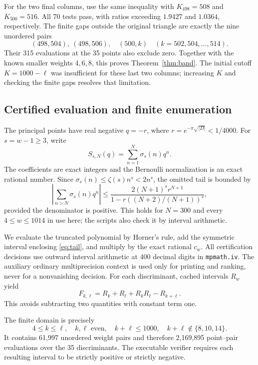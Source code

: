 \documentclass[11pt]{article}
\begin{document}
For the two final columns, use the same inequality with $K_{498}=508$ and $K_{500}=516$. All 70 tests pass, with ratios exceeding $1.9427$ and $1.0364$, respectively. The finite gaps outside the original triangle are exactly the nine unordered pairs
\[
 (498,504),\ (498,506),\quad (500,k)\quad(k=502,504,\ldots,514).
\]
Their 315 evaluations at the 35 points also exclude zero. Together with the known smaller weights $4,6,8$, this proves Theorem~\ref{thm:band}. The initial cutoff $K=1000-\ell$ was insufficient for these last two columns; increasing $K$ and checking the finite gaps resolves that limitation.

\subsection{Certified evaluation and finite enumeration}
The principal points have real negative $q=-r$, where $r=e^{-\pi\sqrt{|D|}}<1/4000$. For $s=w-1\ge3$, write
\[
 S_{s,N}(q)=\sum_{n=1}^{N}\sigma_s(n)q^n.
\]
The coefficients are exact integers and the Bernoulli normalization is an exact rational number. Since $\sigma_s(n)\le\zeta(s)n^s<2n^s$, the omitted tail is bounded by
\begin{equation}\label{eq:tail}
 \left|\sum_{n>N}\sigma_s(n)q^n\right|
 \le\frac{2(N+1)^s r^{N+1}}{1-r((N+2)/(N+1))^s},
\end{equation}
provided the denominator is positive. This holds for $N=300$ and every $4\le w\le1014$ in use here; the scripts also check it by interval arithmetic.

We evaluate the truncated polynomial by Horner's rule, add the symmetric interval enclosing \eqref{eq:tail}, and multiply by the exact rational $c_w$. All certification decisions use outward interval arithmetic at 400 decimal digits in \texttt{mpmath.iv}. The auxiliary ordinary multiprecision context is used only for printing and ranking, never for a nonvanishing decision. For each discriminant, cached intervals $R_w$ yield
\[
 F_{k,\ell}=R_k+R_\ell+R_kR_\ell-R_{k+\ell}.
\]
This avoids subtracting two quantities with constant term one.

The finite domain is precisely
\[
 4\le k\le\ell,\quad k,\ell\text{ even},\quad k+\ell\le1000,
 \quad k+\ell\notin\{8,10,14\}.
\]
It contains 61,997 unordered weight pairs and therefore 2,169,895 point--pair evaluations over the 35 discriminants. The executable verifier requires each resulting interval to be strictly positive or strictly negative.
\end{document}
